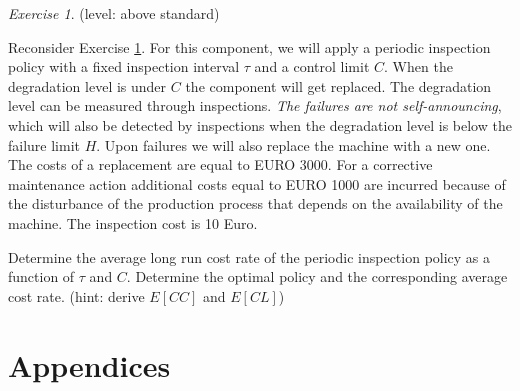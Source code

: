 \documentclass[10pt,a4paper]{article}
\theoremstyle{remark}
\newtheorem{exercise}{Exercise}
\begin{document}
\begin{exercise}\label{exercise:degradation2}
(level: above standard)

Reconsider Exercise \ref{exercise:degradation2}. 
For this component, we will apply a periodic inspection policy with a fixed inspection interval $\tau$ and a control limit $C$. When the degradation level is under $C$ the component will get replaced. The degradation level can be measured through inspections. \emph{The failures are not self-announcing}, which will also be detected by inspections when the degradation level is below the failure limit $H$. Upon failures we will also replace the machine with a new one. The costs of a replacement are equal to EURO 3000. For a corrective maintenance action additional costs equal to EURO 1000 are incurred because of the disturbance of the production process that depends on the availability of the machine. The inspection cost is 10 Euro.

Determine the average long run cost rate of the periodic inspection policy as a function of $\tau$ and $C$. Determine the optimal policy and the corresponding average cost rate. (hint: derive $E[CC]$ and $E[CL]$)

\end{exercise}

\section{Appendices}
\end{document}
